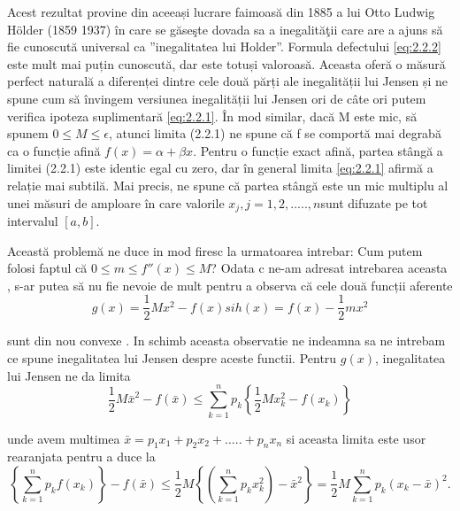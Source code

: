 \documentclass[a4paper,12pt,oneside]{report}
\begin{document}
Acest rezultat provine din aceeași lucrare faimoasă din 1885 a lui Otto Ludwig Hölder (1859 1937) în care se găseşte dovada sa a inegalităţii care are a ajuns să fie cunoscută universal ca ”inegalitatea lui Holder”. Formula defectului \ref{eq:2.2.2} este mult mai puțin cunoscută, dar este totuși valoroasă. Aceasta oferă o măsură perfect naturală a diferenței dintre cele două părți ale inegalității lui Jensen și ne spune cum să învingem versiunea  inegalității lui Jensen ori de câte ori putem verifica ipoteza suplimentară \ref{eq:2.2.1}. 
În mod similar, dacă M este mic, să spunem \(0 \leq M \leq \epsilon\), atunci limita (2.2.1) ne spune că f se comportă mai degrabă ca o funcție afină \(f\left ( x \right ) = \alpha  + \beta x\). Pentru o funcție exact afină, partea stângă a limitei (2.2.1) este identic egal cu zero, dar în general limita \ref{eq:2.2.1} afirmă a relație mai subtilă. Mai precis, ne spune că partea stângă este un mic multiplu al unei măsuri de amploare  în care valorile \(x_{j}, j = 1,2,.....,n \)sunt difuzate pe tot intervalul \(\left [ a, b \right ]. \)

Această problemă ne duce in mod firesc la urmatoarea intrebar: Cum putem folosi faptul că \(0\leq m\leq {f}''\left ( x \right )\leq M \)? Odata c ne-am adresat intrebarea aceasta , s-ar putea să nu fie nevoie de mult pentru a observa că cele două funcții aferente
\begin{displaymath}
  g\left ( x \right ) = \frac{1}{2}Mx^{2} - f\left ( x \right ) si 
h\left ( x \right ) = f\left ( x \right ) - \frac{1}{2}mx^{2}
\end{displaymath}

sunt din nou convexe . In schimb aceasta observatie ne indeamna sa ne intrebam ce spune inegalitatea lui Jensen despre aceste functii. 
	Pentru \(g\left ( x \right )\), inegalitatea lui Jensen ne da limita 
\begin{displaymath}
  \frac{1}{2}M\bar{x}^{2} - f\left ( \bar{x} \right )\leq \sum_{k = 1}^{n}p_{k}\left \{ \frac{1}{2}Mx_{k}^{2} - f\left ( x_{k} \right )\right \}
\end{displaymath}

unde avem multimea \(\bar{x} = p_{1}x_{1}+ p_{2}x_{2}+ ..... + p_{n}x_{n}\) si aceasta limita este usor rearanjata pentru a duce la 
\begin{displaymath}
  \left \{ \sum_{k = 1}^{n} p_{k}f\left ( x_{k} \right )\right \} - f\left (\bar{x}  \right )\leq \frac{1}{2}M\left \{ \left ( \sum_{k=1}^{n} p_{k}x_{k}^{2}\right ) - \bar{x}^{2} \right \} = \frac{1}{2}M\sum_{k = 1}^{n}p_{k}\left ( x_{k} - \bar{x} \right )^{2}. 
\end{displaymath}
\end{document}
